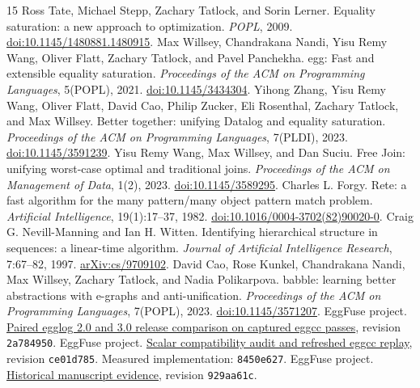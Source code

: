 \documentclass[10pt,letterpaper]{article}
\begin{document}
\begin{thebibliography}{15}\small
{} Ross Tate, Michael Stepp, Zachary Tatlock, and Sorin Lerner.
Equality saturation: a new approach to optimization. \emph{POPL}, 2009.
\href{https://doi.org/10.1145/1480881.1480915}{doi:10.1145/1480881.1480915}.
 Max Willsey, Chandrakana Nandi, Yisu Remy Wang, Oliver Flatt,
Zachary Tatlock, and Pavel Panchekha. egg: Fast and extensible equality
saturation. \emph{Proceedings of the ACM on Programming Languages}, 5(POPL), 2021.
\href{https://doi.org/10.1145/3434304}{doi:10.1145/3434304}.
 Yihong Zhang, Yisu Remy Wang, Oliver Flatt, David Cao,
Philip Zucker, Eli Rosenthal, Zachary Tatlock, and Max Willsey.
Better together: unifying Datalog and equality saturation.
\emph{Proceedings of the ACM on Programming Languages}, 7(PLDI), 2023.
\href{https://doi.org/10.1145/3591239}{doi:10.1145/3591239}.
 Yisu Remy Wang, Max Willsey, and Dan Suciu.
Free Join: unifying worst-case optimal and traditional joins.
\emph{Proceedings of the ACM on Management of Data}, 1(2), 2023.
\href{https://doi.org/10.1145/3589295}{doi:10.1145/3589295}.
 Charles L. Forgy. Rete: a fast algorithm for the many
pattern/many object pattern match problem. \emph{Artificial Intelligence},
19(1):17--37, 1982.
\href{https://doi.org/10.1016/0004-3702(82)90020-0}{doi:10.1016/0004-3702(82)90020-0}.
 Craig G. Nevill-Manning and Ian H. Witten. Identifying hierarchical structure in sequences: a linear-time algorithm. \emph{Journal of Artificial Intelligence Research}, 7:67--82, 1997. \href{https://arxiv.org/abs/cs/9709102}{arXiv:cs/9709102}.
 David Cao, Rose Kunkel, Chandrakana Nandi, Max Willsey, Zachary Tatlock, and Nadia Polikarpova. babble: learning better abstractions with e-graphs and anti-unification. \emph{Proceedings of the ACM on Programming Languages}, 7(POPL), 2023. \href{https://doi.org/10.1145/3571207}{doi:10.1145/3571207}.
 EggFuse project.
\href{https://github.com/MilkBlock/eggfuse/tree/2a784950aef627cc0766a92df2b29cca5ee3681f/benchmarks/egglog3-suite}{Paired egglog 2.0 and 3.0 release comparison on captured eggcc passes}, revision \texttt{2a784950}.
 EggFuse project.
\href{https://github.com/MilkBlock/eggfuse/tree/ce01d785a9c88781bf0a7eb852c8849405f85002/benchmarks}{Scalar compatibility audit and refreshed eggcc replay}, revision \texttt{ce01d785}. Measured implementation: \texttt{8450e627}.
 EggFuse project.
\href{https://github.com/MilkBlock/eggfuse/tree/929aa61c30b7a290e4fc5262ff24994a542e9806/paper/evidence}{Historical manuscript evidence}, revision \texttt{929aa61c}.

\end{thebibliography}
\end{document}
